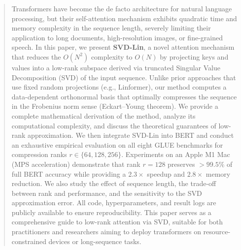\begin{abstract}
Transformers have become the de facto architecture for natural language processing, but their self-attention mechanism exhibits quadratic time and memory complexity in the sequence length, severely limiting their application to long documents, high-resolution images, or fine-grained speech. In this paper, we present \textbf{SVD-Lin}, a novel attention mechanism that reduces the $O(N^2)$ complexity to $O(N)$ by projecting keys and values into a low-rank subspace derived via truncated Singular Value Decomposition (SVD) of the input sequence. Unlike prior approaches that use fixed random projections (e.g., Linformer), our method computes a data-dependent orthonormal basis that optimally compresses the sequence in the Frobenius norm sense (Eckart–Young theorem). We provide a complete mathematical derivation of the method, analyze its computational complexity, and discuss the theoretical guarantees of low-rank approximation. We then integrate SVD-Lin into BERT and conduct an exhaustive empirical evaluation on all eight GLUE benchmarks for compression ranks $r \in \{64, 128, 256\}$. Experiments on an Apple M1 Mac (MPS acceleration) demonstrate that rank $r=128$ preserves $>99.5\%$ of full BERT accuracy while providing a $2.3\times$ speedup and $2.8\times$ memory reduction. We also study the effect of sequence length, the trade-off between rank and performance, and the sensitivity to the SVD approximation error. All code, hyperparameters, and result logs are publicly available to ensure reproducibility. This paper serves as a comprehensive guide to low-rank attention via SVD, suitable for both practitioners and researchers aiming to deploy transformers on resource-constrained devices or long-sequence tasks.
\end{abstract}